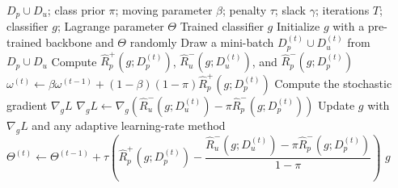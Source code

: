 \documentclass{article}
\begin{document}
\begin{algorithm}[!h]
\renewcommand{\algorithmicrequire}{\textbf{Input:}} %
\renewcommand{\algorithmicensure}{\textbf{Output:}} %
	\caption{DC-PU (dual-constrained PU risk balancing the two error rates)} %
	\begin{algorithmic}[1] %
	    \REQUIRE
	    $D_{p}\cup D_{u}$; class prior $\pi$; moving parameter $\beta$; penalty $\tau$;
	    slack $\gamma$; iterations $T$; classifier $g$; Lagrange parameter $\Theta$
	    \ENSURE
	    Trained classifier $g$
	    \STATE Initialize $g$ with a pre-trained backbone and $\Theta$ randomly
	    \STATE Draw a mini-batch $D_{p}^{(t)}\cup D_{u}^{(t)}$ from $D_{p}\cup D_{u}$
	    \STATE Compute $\hat{R}_{p}^{+}(g;D_{p}^{(t)})$, $\hat{R}_{u}^{-}(g;D_{u}^{(t)})$, and $\hat{R}_{p}^{-}(g;D_{p}^{(t)})$
	    \STATE $\omega^{(t)}\leftarrow \beta\omega^{(t-1)}+(1-\beta)(1-\pi)\hat{R}_{p}^{+}(g;D_{p}^{(t)})$ %
	    \STATE Compute the stochastic gradient $\nabla_{g}L$ %
	    \ELSE
	    \STATE $\nabla_{g}L\leftarrow \nabla_{g}\!\left(\hat{R}_{u}^{-}(g;D_{u}^{(t)})-\pi\hat{R}_{p}^{-}(g;D_{p}^{(t)})\right)$ %
	    \ENDIF
	    \STATE Update $g$ with $\nabla_{g}L$ and any adaptive learning-rate method
	    \STATE $\Theta^{(t)}\leftarrow \Theta^{(t-1)}+\tau\left(\hat{R}_{p}^{+}(g;D_{p}^{(t)})-\dfrac{\hat{R}_{u}^{-}(g;D_{u}^{(t)})-\pi\hat{R}_{p}^{-}(g;D_{p}^{(t)})}{1-\pi}\right)$ %
	    \ENDFOR
		\RETURN $g$
	\end{algorithmic}
\end{algorithm}
\end{document}
